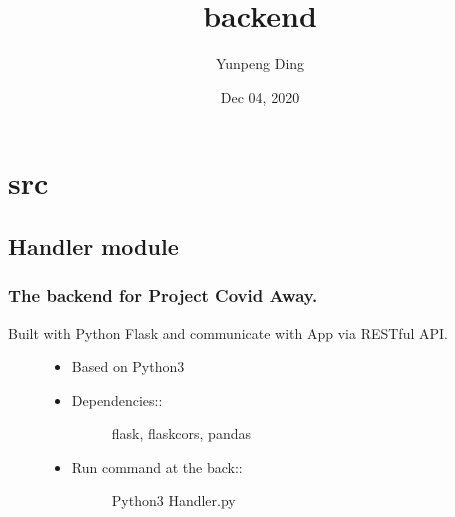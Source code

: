 \documentclass[letterpaper,10pt,english]{sphinxmanual}
\title{backend}
\date{Dec 04, 2020}
\author{Yunpeng Ding}
\begin{document}
\pagestyle{empty}
\sphinxmaketitle
\pagestyle{plain}
\sphinxtableofcontents
\pagestyle{normal}
\label{\detokenize{index::doc}}



\chapter{src}
\label{\detokenize{modules:src}}\label{\detokenize{modules::doc}}

\section{Handler module}
\label{\detokenize{Handler:module-Handler}}\label{\detokenize{Handler:handler-module}}\label{\detokenize{Handler::doc}}

\subsection{The backend for Project Covid Away.}
\label{\detokenize{Handler:the-backend-for-project-covid-away}}
Built with Python Flask and communicate with App via RESTful API.
\begin{description}
\item[{}] \leavevmode\begin{itemize}
\item {} 
Based on Python3

\item {} \begin{description}
\item[{Dependencies::}] \leavevmode
flask, flask\sphinxhyphen{}cors, pandas

\end{description}

\item {} \begin{description}
\item[{Run command at the back::}] \leavevmode
Python3 Handler.py

\end{description}

\end{itemize}

\end{description}
\end{document}
